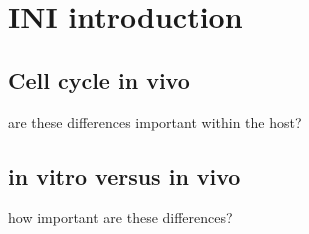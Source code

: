 \chapter{INI introduction}

\section{Cell cycle in vivo}
are these differences important within the host?


\section{in vitro versus in vivo}
how important are these differences?




